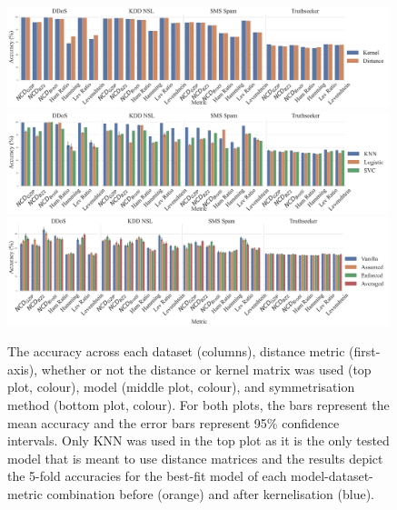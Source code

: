 \documentclass[preprint,12pt]{article}
\begin{document}
\begin{figure}[!htb]
    \centering
    \includegraphics[width=0.99\textwidth]{images/accuracy_vs_kernel.pdf}
    \hfill
    \includegraphics[width=0.99\textwidth]{images/accuracy_vs_metric.pdf}
    \hfill
    \includegraphics[width=0.99\textwidth]{images/accuracy_vs_symmetry.pdf}
    \caption{
    The accuracy across each dataset (columns), distance metric (first-axis), whether or not the distance or kernel matrix was used (top plot, colour), model (middle plot, colour), and symmetrisation method (bottom plot, colour). 
    For both plots, the bars represent the mean accuracy and the error bars represent 95\% confidence intervals.
    Only KNN was used in the top plot as it is the only tested model that is meant to use distance matrices and the results depict the 5-fold accuracies for the best-fit model of each model-dataset-metric combination before (orange) and after kernelisation (blue).
    }
    \label{fig:acc}
\end{figure}
\end{document}
